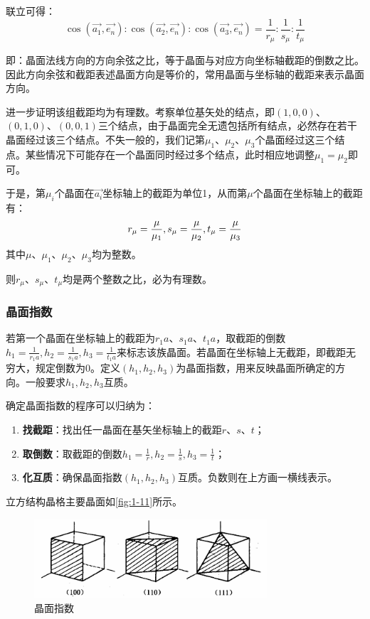     联立可得：
    \[
        \cos (\vec{a_1}, \vec{e_n}) : \cos (\vec{a_2}, \vec{e_n}) : \cos (\vec{a_3}, \vec{e_n}) = \frac{1}{r_\mu} : \frac{1}{s_\mu} : \frac{1}{t_\mu}
    \]

    即：晶面法线方向的方向余弦之比，等于晶面与对应方向坐标轴截距的倒数之比。因此方向余弦和截距表述晶面方向是等价的，常用晶面与坐标轴的截距来表示晶面方向。

    进一步证明该组截距均为有理数。考察单位基矢处的结点，即$(1,0,0)$、$(0,1,0)$、$(0,0,1)$三个结点，由于晶面完全无遗包括所有结点，必然存在若干晶面经过该三个结点。不失一般的，我们记第$\mu_1$、$\mu_2$、$\mu_3$个晶面经过这三个结点。某些情况下可能存在一个晶面同时经过多个结点，此时相应地调整$\mu_1=\mu_2$即可。

    于是，第$\mu_i$个晶面在$\vec{a_i}$坐标轴上的截距为单位1，从而第$\mu$个晶面在坐标轴上的截距有：
    \[
        r_\mu = \frac{\mu}{\mu_1}, \\
        s_\mu = \frac{\mu}{\mu_2}, \\
        t_\mu = \frac{\mu}{\mu_3}
    \]
    其中$\mu$、$\mu_1$、$\mu_2$、$\mu_3$均为整数。
    
    则$r_\mu$、$s_\mu$、$t_\mu$均是两个整数之比，必为有理数。

\subsubsection{晶面指数}
    若第一个晶面在坐标轴上的截距为$r_1 a$、$s_1 a$、$t_1 a$，取截距的倒数$h_1 = \frac{1}{r_1 a}, h_2 = \frac{1}{s_1 a}, h_3 = \frac{1}{t_1 a}$来标志该族晶面。若晶面在坐标轴上无截距，即截距无穷大，规定倒数为0。定义$(h_1, h_2, h_3)$为晶面指数，用来反映晶面所确定的方向。一般要求$h_1, h_2, h_3$互质。

    确定晶面指数的程序可以归纳为：
    \begin{enumerate}[itemsep=0pt,parsep=0pt]
        \item \textbf{找截距}：找出任一晶面在基矢坐标轴上的截距$r$、$s$、$t$；
        \item \textbf{取倒数}：取截距的倒数$h_1 = \frac{1}{r}, h_2 = \frac{1}{s}, h_3 = \frac{1}{t}$；
        \item \textbf{化互质}：确保晶面指数$(h_1, h_2, h_3)$互质。负数则在上方画一横线表示。
    \end{enumerate}

    立方结构晶格主要晶面如\autoref{fig:1-11}所示。

    \begin{figure}[!htbp]
        \centering    
        \includegraphics[height=8em, keepaspectratio=true]{pic/1-35}
        \caption{晶面指数}
        \label{fig:1-11}
    \end{figure}

